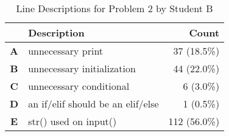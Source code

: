 \begin{table}
\centering
\caption{Line Descriptions for Problem 2 by Student B}
\label{table:problem2_studentB}
\renewcommand{\arraystretch}{0.5}
\begin{tabular}{|c|l|r|}
\hline
\textbf{} & \textbf{Description} & \textbf{Count} \\ \hline
\textbf{A} & unnecessary print & 37 (18.5\%) \\ \hline
\textbf{B} & unnecessary initialization & 44 (22.0\%) \\ \hline
\textbf{C} & unnecessary conditional & 6 (3.0\%) \\ \hline
\textbf{D} & an if/elif should be an elif/else & 1 (0.5\%) \\ \hline
\textbf{E} & str() used on input() & 112 (56.0\%) \\ \hline
\end{tabular}
\end{table}
